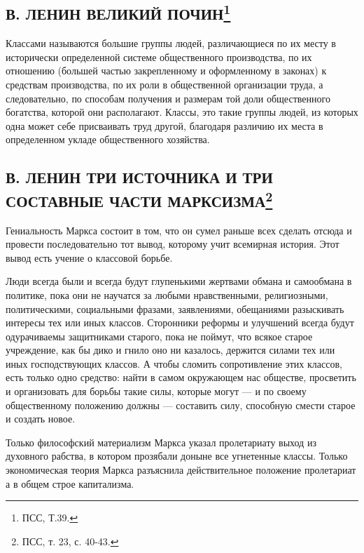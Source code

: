 \documentclass[12pt]{article}
\newcommand{\parnum}{(\arabic{parcount})}
\newcounter{parcount}
\newenvironment{parnumbers}{%
  \par%
  \everypar{\noindent \stepcounter{parcount}\marginpar[]{\parnum}}%
}{}
\begin{document}
\subsection{В. ЛЕНИН ВЕЛИКИЙ ПОЧИН\footnote{ПСС, Т.39.}}
  \begin{parnumbers}
    Классами называются большие группы людей, различающиеся по их месту в исторически определенной системе общественного производства, по их отношению (большей частью закрепленному и оформленному в законах) к средствам производства, по их роли в общественной организации труда, а следовательно, по способам получения и размерам той доли общественного богатства, которой они располагают. Классы, это такие группы людей, из которых одна может себе присваивать труд другой, благодаря различию их места в определенном укладе общественного хозяйства.

  \end{parnumbers}



\subsection{В. ЛЕНИН ТРИ ИСТОЧНИКА И ТРИ СОСТАВНЫЕ ЧАСТИ МАРКСИЗМА\footnote{ПСС, т. 23, с. 40-43.}}
  \begin{parnumbers}
        Гениальность Маркса состоит в том, что он сумел раньше всех сделать отсюда и провести последовательно тот вывод, которому учит всемирная история. Этот вывод есть учение о классовой борьбе.

    Люди всегда были и всегда будут глупенькими жертвами обмана и самообмана в политике, пока они не научатся за любыми нравственными, религиозными, политическими, социальными фразами, заявлениями, обещаниями разыскивать интересы тех или иных классов. Сторонники реформы и улучшений всегда будут одурачиваемы защитниками старого, пока не поймут, что всякое старое учреждение, как бы дико и гнило оно ни казалось, держится силами тех или иных господствующих классов. А чтобы сломить сопротивление этих классов, есть только одно средство: найти в самом окружающем нас обществе, просветить и организовать для борьбы такие силы, которые могут — и по своему общественному положению должны — составить силу, способную смести старое и создать новое.

    Только философский материализм Маркса указал пролетариату выход из духовного рабства, в котором прозябали доныне все угнетенные классы. Только экономическая теория Маркса разъяснила действительное положение пролетариат а в общем строе капитализма.

  \end{parnumbers}
\end{document}
